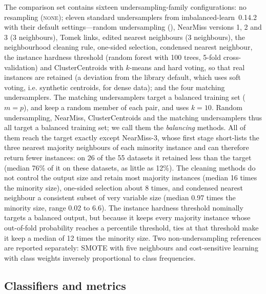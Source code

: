 The comparison set contains sixteen undersampling-family configurations: no resampling (\textsc{none}); eleven standard undersamplers from imbalanced-learn~0.14.2 \citep{lemaitre2017imbalanced} with their default settings---random undersampling (\RUS), NearMiss versions 1, 2 and 3 (3 neighbours), Tomek links, edited nearest neighbours (3 neighbours), the neighbourhood cleaning rule, one-sided selection, condensed nearest neighbour, the instance hardness threshold (random forest with 100 trees, 5-fold cross-validation) and ClusterCentroids with $k$-means and hard voting, so that real instances are retained (a deviation from the library default, which uses soft voting, i.e. synthetic centroids, for dense data); and the four matching undersamplers. The matching undersamplers target a balanced training set ($m=p$), \MUSCS{} and \MUSCO{} keep a random member of each pair, and \MUSCO{} uses $k=10$. Random undersampling, NearMiss, ClusterCentroids and the matching undersamplers thus all target a balanced training set; we call them the \emph{balancing} methods. All of them reach the target exactly except NearMiss-3, whose first stage short-lists the three nearest majority neighbours of each minority instance and can therefore return fewer instances: on 26 of the 55 datasets it retained less than the target (median 76\% of it on these datasets, as little as 12\%). The cleaning methods do not control the output size and retain most majority instances (median 16 times the minority size), one-sided selection about 8 times, and condensed nearest neighbour a consistent subset of very variable size (median 0.97 times the minority size, range 0.02 to 6.6). The instance hardness threshold nominally targets a balanced output, but because it keeps every majority instance whose out-of-fold probability reaches a percentile threshold, ties at that threshold make it keep a median of 12 times the minority size. Two non-undersampling references are reported separately: SMOTE with five neighbours \citep{chawla2002smote} and cost-sensitive learning with class weights inversely proportional to class frequencies.

\subsection{Classifiers and metrics}\label{sec:design:classifiers}

